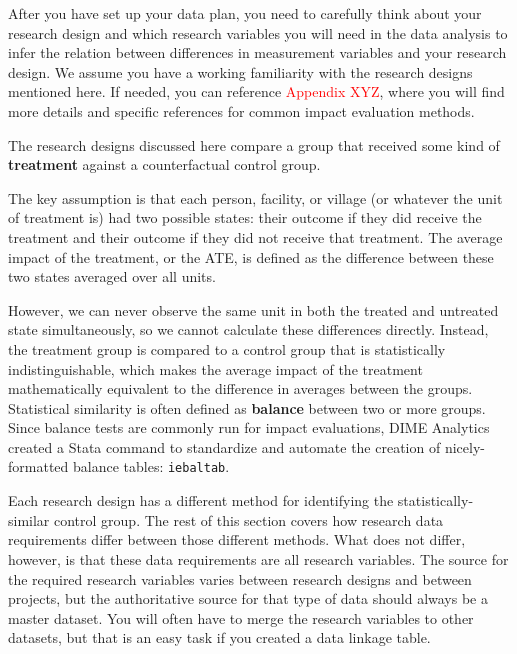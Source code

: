 After you have set up your data plan,
you need to carefully think about your research design 
and which research variables you will need in the data analysis
to infer the relation between differences in measurement variables 
and your research design.
We assume you have a working familiarity
with the research designs mentioned here.
If needed, you can reference \textcolor{red}{Appendix XYZ},
where you will find more details 
and specific references for common impact evaluation methods.

The research designs discussed here compare a group that received
some kind of \textbf{treatment}
against a counterfactual control group.

The key assumption is that each
person, facility, or village 
(or whatever the unit of treatment is)
had two possible states: their outcome if they did receive the treatment
and their outcome if they did not receive that treatment.
The average impact of the treatment, or the ATE,
is defined as the difference 
between these two states averaged over all units.

However, we can never observe the same unit
in both the treated and untreated state simultaneously,
so we cannot calculate these differences directly.
Instead, the treatment group is compared to a control group
that is statistically indistinguishable,
which makes the average impact of the treatment
mathematically equivalent to 
the difference in averages between the groups.
Statistical similarity is often defined
as \textbf{balance} between two or more groups.	
Since balance tests are commonly run for impact evaluations,
DIME Analytics created a Stata command to 
standardize and automate the creation of nicely-formatted balance tables:
\texttt{iebaltab}.

Each research design has a different method for
identifying the statistically-similar control group. 
The rest of this section covers how research data requirements 
differ between those different methods.
What does not differ, however, 
is that these data requirements are all research variables.
The source for the required research variables varies
between research designs and between projects, 
but the authoritative source for that type of data should
always be a master dataset.
You will often have to merge 
the research variables to other datasets, 
but that is an easy task 
if you created a data linkage table.



